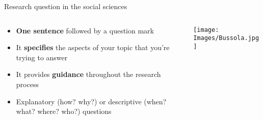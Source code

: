 \documentclass[10pt, aspectratio=169]{beamer}
\begin{document}
\begin{frame}{Research question in the social sciences}
    \begin{columns}
        \begin{column}{0.5\textwidth}
            \begin{itemize}
                \item \textbf{One sentence} followed by a question mark
                \vspace{0.3cm}
                \item It \textbf{specifies} the aspects of your topic that you're trying to answer
                \vspace{0.3cm}
                \item It provides \textbf{guidance} throughout the research process
                \vspace{0.3cm}
                \item Explanatory (how? why?) or descriptive (when? what? where? who?) questions
            \end{itemize}
        \end{column}
        \begin{column}{0.5\textwidth}
        \begin{center}
            \texttt{[image: Images/Bussola.jpg]}
            \end{center}
        \end{column}
    \end{columns}
\end{frame}
\end{document}
